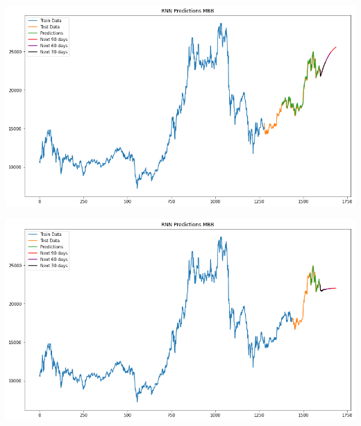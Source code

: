 \documentclass[conference]{IEEEtran}
\begin{document}
\begin{minipage}{0.21\textwidth}
    \centering
    \includegraphics[width=\linewidth]{images/RNN/RNN_MBB_82.png}
    \label{fig:image1}
\end{minipage}
\hfill
\begin{minipage}{0.21\textwidth}
    \centering
    \includegraphics[width=\linewidth]{images/RNN/RNN_MBB_91.png}
    \label{fig:image2}
\end{minipage}
\end{document}
